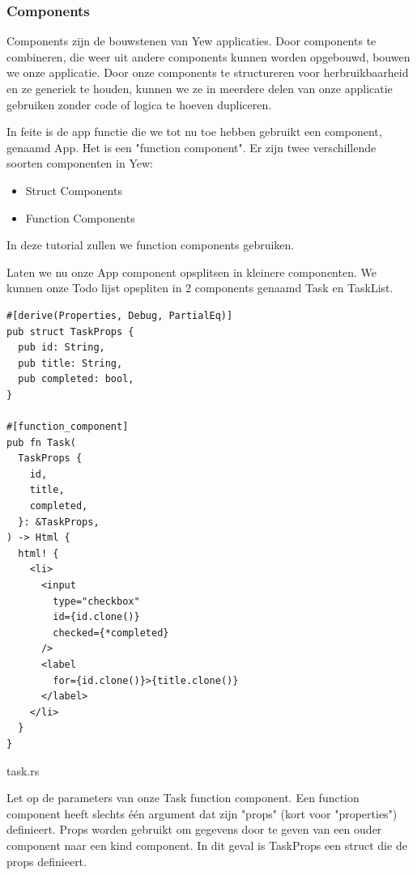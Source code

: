 \clearpage

\subsubsection{Components}

Components zijn de bouwstenen van Yew applicaties. Door components te combineren, die weer uit
andere components kunnen worden opgebouwd, bouwen we onze applicatie. Door onze components te
structureren voor herbruikbaarheid en ze generiek te houden, kunnen we ze in meerdere delen van onze
applicatie gebruiken zonder code of logica te hoeven dupliceren.

In feite is de app functie die we tot nu toe hebben gebruikt een component, genaamd App. Het is een
"function component". Er zijn twee verschillende soorten componenten in Yew:
\begin{itemize}
  \item Struct Components 
  \item Function Components
\end{itemize}

In deze tutorial zullen we function components gebruiken.

Laten we nu onze App component opsplitsen in kleinere componenten. We kunnen onze Todo lijst
opspliten in 2 components genaamd Task en TaskList.

\begin{listing}[h]
\begin{verbatim}
#[derive(Properties, Debug, PartialEq)]
pub struct TaskProps {
  pub id: String,
  pub title: String,
  pub completed: bool,
}

#[function_component]
pub fn Task(
  TaskProps {
    id,
    title,
    completed,
  }: &TaskProps,
) -> Html {
  html! {
    <li>
      <input
        type="checkbox"
        id={id.clone()}
        checked={*completed}
      />
      <label
        for={id.clone()}>{title.clone()}
      </label>
    </li>
  }
}
\end{verbatim}
\caption{task.rs}
\end{listing}

\clearpage

Let op de parameters van onze Task function component. Een function component heeft slechts één
argument dat zijn "props" (kort voor "properties") definieert. Props worden gebruikt om gegevens
door te geven van een ouder component naar een kind component. In dit geval is TaskProps een struct
die de props definieert.

